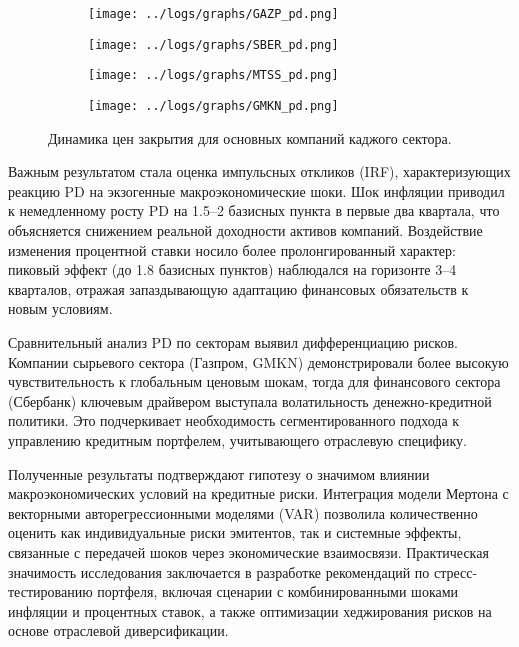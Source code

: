 \documentclass[]{article}
\begin{document}
	
	\begin{figure}[ht]
		\centering
		\begin{subfigure}[b]{0.48\textwidth} %
			\texttt{[image: ../logs/graphs/GAZP\_pd.png]}
			\label{fig:img1}
		\end{subfigure}
		\hfill %
		\begin{subfigure}[b]{0.48\textwidth}
			\texttt{[image: ../logs/graphs/SBER\_pd.png]}
			\label{fig:img2}
		\end{subfigure}
		
		\vspace{0.5cm} %
		
		\begin{subfigure}[b]{0.48\textwidth}
			\texttt{[image: ../logs/graphs/MTSS\_pd.png]}
			\label{fig:img3}
		\end{subfigure}
		\hfill
		\begin{subfigure}[b]{0.48\textwidth}
			\texttt{[image: ../logs/graphs/GMKN\_pd.png]}
			\label{fig:img4}
		\end{subfigure}
		\caption{Динамика цен закрытия для основных компаний каджого сектора.}
		\label{fig:PDs}
	\end{figure}
	
	
	
	Важным результатом стала оценка импульсных откликов (IRF), характеризующих реакцию PD на экзогенные макроэкономические шоки. Шок инфляции приводил к немедленному росту PD на 1.5–2 базисных пункта в первые два квартала, что объясняется снижением реальной доходности активов компаний. Воздействие изменения процентной ставки носило более пролонгированный характер: пиковый эффект (до 1.8 базисных пунктов) наблюдался на горизонте 3–4 кварталов, отражая запаздывающую адаптацию финансовых обязательств к новым условиям.
	
	Сравнительный анализ PD по секторам выявил дифференциацию рисков. Компании сырьевого сектора (Газпром, GMKN) демонстрировали более высокую чувствительность к глобальным ценовым шокам, тогда для финансового сектора (Сбербанк) ключевым драйвером выступала волатильность денежно-кредитной политики. Это подчеркивает необходимость сегментированного подхода к управлению кредитным портфелем, учитывающего отраслевую специфику.
	
	Полученные результаты подтверждают гипотезу о значимом влиянии макроэкономических условий на кредитные риски. Интеграция модели Мертона с векторными авторегрессионными моделями (VAR) позволила количественно оценить как индивидуальные риски эмитентов, так и системные эффекты, связанные с передачей шоков через экономические взаимосвязи. Практическая значимость исследования заключается в разработке рекомендаций по стресс-тестированию портфеля, включая сценарии с комбинированными шоками инфляции и процентных ставок, а также оптимизации хеджирования рисков на основе отраслевой диверсификации.
	
\end{document}
